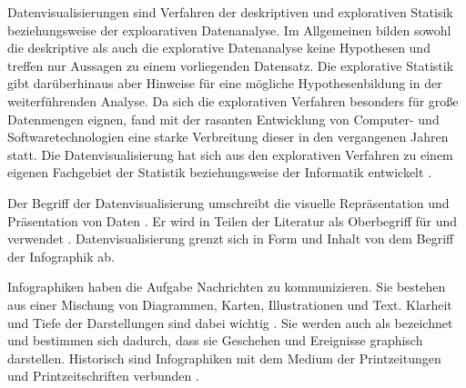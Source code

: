 Datenvisualisierungen sind Verfahren der deskriptiven und explorativen Statisik beziehungsweise der exploarativen Datenanalyse. 
Im Allgemeinen bilden sowohl die deskriptive als auch die explorative Datenanalyse keine Hypothesen und treffen nur Aussagen zu einem vorliegenden Datensatz. 
Die explorative Statistik gibt darüberhinaus aber Hinweise für eine mögliche Hypothesenbildung in der weiterführenden Analyse. 
Da sich die explorativen Verfahren besonders für große Datenmengen eignen, fand mit der rasanten Entwicklung von Computer- und Softwaretechnologien 
eine starke Verbreitung dieser in den vergangenen Jahren statt. Die Datenvisualisierung hat sich aus den explorativen Verfahren zu einem eigenen Fachgebiet der Statistik 
beziehungsweise der Informatik entwickelt \cite[Vgl.][28 f.]{becker_stochastische_2016}.


Der Begriff der Datenvisualisierung umschreibt die visuelle Repräsentation und Präsentation von Daten \cite[Vgl.][15 ff.]{kirk_data_2019}.
Er wird in Teilen der Literatur als Oberbegriff für  und 
 verwendet \cite[Vgl.][11]{few_now_2009}.
Datenvisualisierung grenzt sich in Form und Inhalt von dem Begriff der Infographik ab. 

Infographiken haben die Aufgabe Nachrichten zu kommunizieren.
Sie bestehen aus einer Mischung von Diagrammen, Karten, Illustrationen und Text. Klarheit und Tiefe der Darstellungen sind dabei wichtig
\cite[Vgl.][31]{cairo_truthful_2016}. Sie werden auch als 
bezeichnet und bestimmen sich dadurch, dass sie Geschehen und Ereignisse graphisch darstellen. 
Historisch sind Infographiken mit dem Medium der Printzeitungen und Printzeitschriften verbunden \cite[Vgl.][27]{kirk_data_2019}.\\

